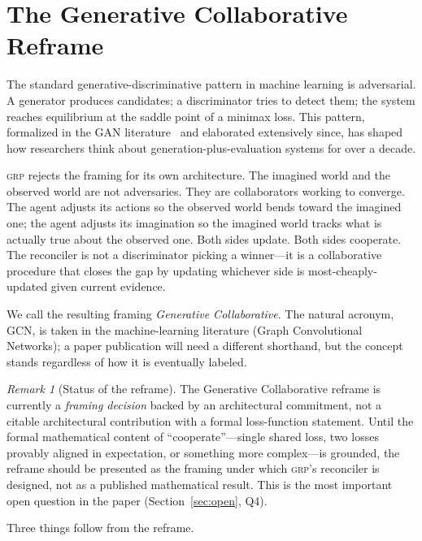 \documentclass[12pt]{article}
\theoremstyle{definition}
\theoremstyle{remark}
\newtheorem{remark}[theorem]{Remark}
\newcommand{\grp}{\textsc{grp}}
\begin{document}
\section{The Generative Collaborative Reframe}
\label{sec:gencol}

The standard generative-discriminative pattern in machine learning is
adversarial. A generator produces candidates; a discriminator tries to
detect them; the system reaches equilibrium at the saddle point of a
minimax loss. This pattern, formalized in the GAN
literature~\cite{gan2014} and elaborated extensively since, has shaped
how researchers think about generation-plus-evaluation systems for
over a decade.

\grp{} rejects the framing for its own architecture. The imagined
world and the observed world are not adversaries. They are
collaborators working to converge. The agent adjusts its actions so
the observed world bends toward the imagined one; the agent adjusts
its imagination so the imagined world tracks what is actually true
about the observed one. Both sides update. Both sides cooperate. The
reconciler is not a discriminator picking a winner---it is a
collaborative procedure that closes the gap by updating whichever
side is most-cheaply-updated given current evidence.

We call the resulting framing \emph{Generative Collaborative}. The
natural acronym, GCN, is taken in the machine-learning literature
(Graph Convolutional Networks); a paper publication will need a
different shorthand, but the concept stands regardless of how it is
eventually labeled.

\begin{remark}[Status of the reframe]
\label{rem:gencol-status}
The Generative Collaborative reframe is currently a \emph{framing
decision} backed by an architectural commitment, not a citable
architectural contribution with a formal loss-function statement.
Until the formal mathematical content of ``cooperate''---single shared
loss, two losses provably aligned in expectation, or something more
complex---is grounded, the reframe should be presented as the framing
under which \grp{}'s reconciler is designed, not as a published
mathematical result. This is the most important open question in the
paper (Section~\ref{sec:open}, Q4).
\end{remark}

Three things follow from the reframe.
\end{document}
